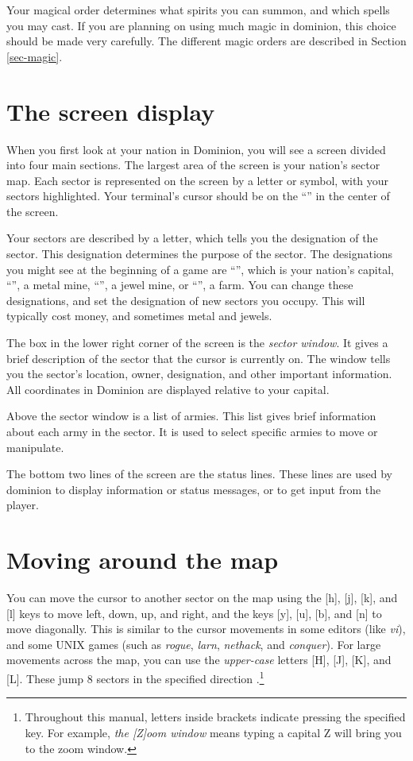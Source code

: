 Your magical order determines what spirits you can summon, and which
spells you may cast.  If you are planning on using much magic in
dominion, this choice should be made very carefully.  The different
magic orders are described in Section \ref{sec-magic}.

\section{The screen display}

When you first look at your nation in Dominion, you will see a screen
divided into four main sections.  The largest area of the screen is
your nation's sector map.  Each sector is represented on the
screen by a letter or symbol, with your sectors highlighted.  Your
terminal's cursor should be on the ``'' in the center of the screen.

Your sectors are described by a letter, which tells you the
designation of the sector.  This designation determines the purpose of
the sector.  The designations you might see at the beginning of a game
are ``'', which is your nation's capital, ``'', a metal
mine, ``'', a jewel mine, or ``'', a farm.  You can
change these designations, and set the designation of new sectors you
occupy.  This will typically cost money, and sometimes metal and
jewels.

The box in the lower right corner of the screen is the {\em sector
window}.  It gives a brief description of the sector that the
cursor is currently on.  The window tells you the sector's location,
owner, designation, and other important information.  All coordinates
in Dominion are displayed relative to your capital.

Above the sector window is a list of armies.  This list gives brief
information about each army in the sector.  It is used to select specific
armies to move or manipulate.

The bottom two lines of the screen are the status lines.  These lines
are used by dominion to display information or status messages,
or to get input from the player.

\section{Moving around the map}

You can move the cursor to another sector on the map using the [h],
[j], [k], and [l] keys to move left, down, up, and right, and the keys
[y], [u], [b], and [n] to move diagonally.  This is similar to the
cursor movements in some editors (like {\em vi}), and some UNIX games
(such as {\em rogue}, {\em larn}, {\em nethack}, and {\em conquer}).
For large movements across the map, you can use the {\em upper-case}
letters [H], [J], [K], and [L].  These jump 8 sectors in the specified
direction .\footnote{Throughout this manual, letters inside brackets
indicate pressing the specified key.  For example, {\em the [Z]oom
window} means typing a capital Z will bring you to the zoom window.}

